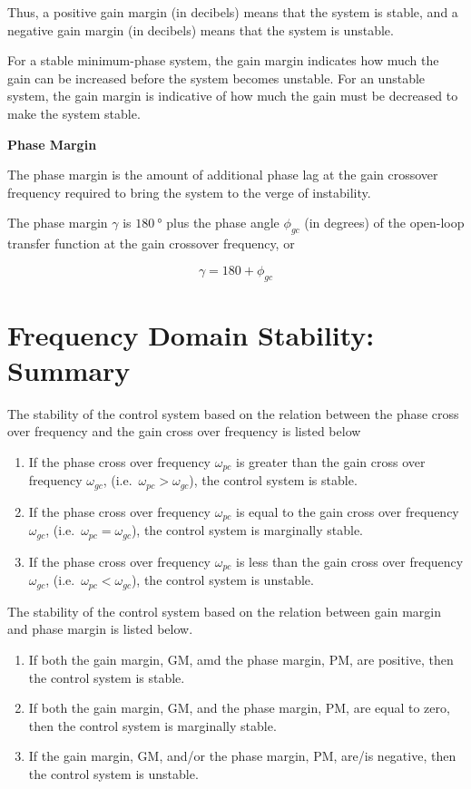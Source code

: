 \documentclass[
  14pt,
  a4paper,
  oneside,
  open=any,
  a4paper,
  14pt]{report}
\providecommand{\tightlist}{%
  \setlength{\itemsep}{0pt}\setlength{\parskip}{0pt}}\usepackage{longtable,booktabs,array}
\begin{document}
Thus, a positive gain margin (in decibels) means that the system is
stable, and a negative gain margin (in decibels) means that the system
is unstable.

For a stable minimum-phase system, the gain margin indicates how much
the gain can be increased before the system becomes unstable. For an
unstable system, the gain margin is indicative of how much the gain must
be decreased to make the system stable.

\textbf{\textbf{Phase Margin}}

The phase margin is the amount of additional phase lag at the gain
crossover frequency required to bring the system to the verge of
instability.

The phase margin \(\gamma\) is \(\SI{180}{\degree}\) plus the phase
angle \(\phi_{gc}\) (in degrees) of the open-loop transfer function at
the gain crossover frequency, or

\[
    \gamma = 180 + \phi_{gc}
\]

\section{Frequency Domain Stability:
Summary}\label{frequency-domain-stability-summary}

The stability of the control system based on the relation between the
phase cross over frequency and the gain cross over frequency is listed
below

\begin{enumerate}
\def\labelenumi{\arabic{enumi}.}
\tightlist
\item
  If the phase cross over frequency \(\omega_{pc}\) is greater than the
  gain cross over frequency \(\omega_{gc}\),
  (i.e.~\(\omega_{pc} > \omega_{gc}\)), the control system is stable.
\item
  If the phase cross over frequency \(\omega_{pc}\) is equal to the gain
  cross over frequency \(\omega_{gc}\),
  (i.e.~\(\omega_{pc} = \omega_{gc}\)), the control system is marginally
  stable.
\item
  If the phase cross over frequency \(\omega_{pc}\) is less than the
  gain cross over frequency \(\omega_{gc}\),
  (i.e.~\(\omega_{pc} < \omega_{gc}\)), the control system is unstable.
\end{enumerate}

The stability of the control system based on the relation between gain
margin and phase margin is listed below.

\begin{enumerate}
\def\labelenumi{\arabic{enumi}.}
\tightlist
\item
  If both the gain margin, GM, amd the phase margin, PM, are positive,
  then the control system is stable.
\item
  If both the gain margin, GM, and the phase margin, PM, are equal to
  zero, then the control system is marginally stable.
\item
  If the gain margin, GM, and/or the phase margin, PM, are/is negative,
  then the control system is unstable.
\end{enumerate}
\end{document}
